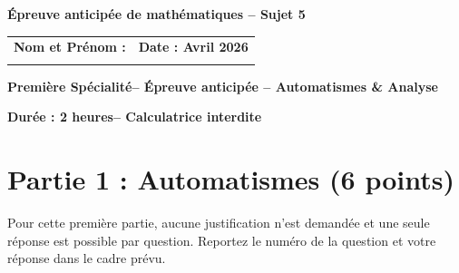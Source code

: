 \documentclass[a4paper, 12pt]{article}
\newcommand{\sujet}{5}
\newcommand{\classe}{Première Spécialité}
\newcommand{\duree}{2 heures}
\newcommand{\datedevoir}{Avril 2026}
\newcommand{\theme}{Épreuve anticipée – Automatismes \& Analyse}
\begin{document}
\begin{center}\Large\textbf{Épreuve anticipée de mathématiques – Sujet \sujet}\end{center}

\begin{tabular}{|p{8cm}|p{8cm}|}
\hline
\textbf{Nom et Prénom :} & \textbf{Date : \datedevoir} \\
\framebox[7.5cm]{\hspace{0.1cm}\begin{minipage}{7.3cm}\vspace{1.5cm}\end{minipage}} & \\
\hline
\end{tabular}

\begin{center}\textbf{\classe – \theme}\end{center}

\textbf{Durée : \duree – Calculatrice interdite}

\section*{Partie 1 : Automatismes (6 points)}
Pour cette première partie, aucune justification n’est demandée et une seule réponse est possible par question. Reportez le numéro de la question et votre réponse dans le cadre prévu.
\end{document}

